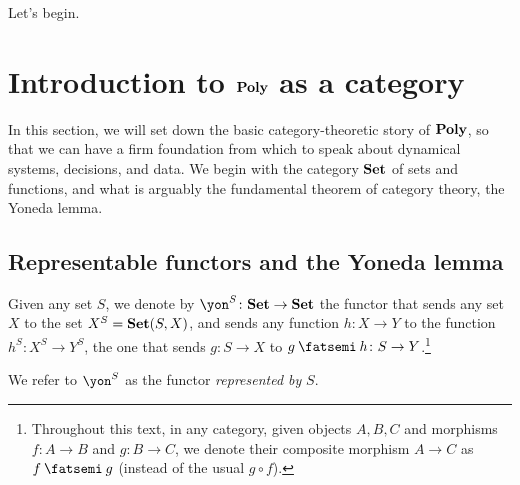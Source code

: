 \documentclass[Book-Poly]{subfiles}
\begin{document}
Let's begin.


\section{Introduction to $\mathbf{Poly}$ as a category}\label{sec.poly}


In this section, we will set down the basic category-theoretic story of $\mathbf{Poly}$, so that we can have a firm foundation from which to speak about dynamical systems, decisions, and data. We begin with the category $\mathbf{Set}$ of sets and functions, and what is arguably the fundamental theorem of category theory, the Yoneda lemma.

\subsection{Representable functors and the Yoneda lemma}

\begin{definition} \label{def.representable}
Given any set $S$, we denote by $\yon^S\colon\smset\to\smset$ the functor that sends any set $X$ to the set $X^S=\mathbf{Set}(S,X)$, and sends any function $h\colon X\to Y$ to the function $h^S\colon X^S\to Y^S$, the one that sends $g\colon S\to X$ to $g\then h\colon S\to Y$.\footnote{Throughout this text, in any category, given objects $A, B, C$ and morphisms $f \colon A \to B$ and $g \colon B \to C$, we denote their composite morphism $A \to C$ as $f \then g$ (instead of the usual $g \circ f$).}

We refer to $\yon^S$ as the functor \emph{represented by} $S$.
\end{definition}
\end{document}
